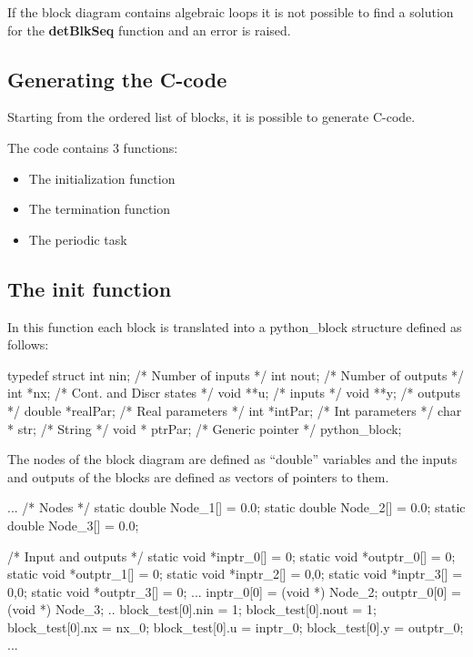 If the block diagram contains algebraic loops it is not possible to find a 
solution for the \textbf{detBlkSeq} function and an error is raised.

\subsection{Generating the C-code}
Starting from the ordered list of blocks, it is possible to generate 
C-code.

The code contains 3 functions:

\begin{itemize}
\item The initialization function
\item The termination function
\item The periodic task
\end{itemize}

\subsection{The init function}

In this function each block is translated into a python\_block structure 
defined as follows:

\begin{code}
typedef struct {
  int nin;             /* Number of inputs */
  int nout;            /* Number of outputs */
  int *nx;             /* Cont. and Discr states */
  void **u;            /* inputs */
  void **y;            /* outputs */
  double *realPar;     /* Real parameters */
  int *intPar;         /* Int parameters */
  char * str;          /* String */
  void * ptrPar;       /* Generic pointer */
}python_block;
\end{code}

The nodes of the block diagram are defined as ``double'' variables and the 
inputs and outputs of the blocks are defined as vectors of pointers to them.

\begin{code}
...
/* Nodes */
static double Node_1[] = {0.0};
static double Node_2[] = {0.0};
static double Node_3[] = {0.0};

/* Input and outputs */
static void *inptr_0[]  = {0};
static void *outptr_0[] = {0};
static void *outptr_1[] = {0};
static void *inptr_2[]  = {0,0};
static void *inptr_3[]  = {0,0};
static void *outptr_3[] = {0};
...
  inptr_0[0]  = (void *) Node_2;
  outptr_0[0] = (void *) Node_3;
..
  block_test[0].nin  = 1;
  block_test[0].nout = 1;
  block_test[0].nx   = nx_0;
  block_test[0].u    = inptr_0;
  block_test[0].y    = outptr_0;
...
\end{code}

